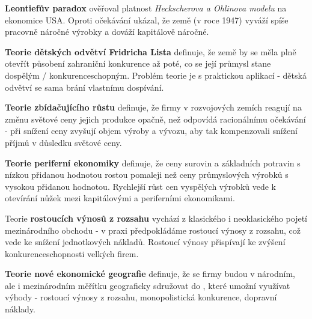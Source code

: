 \textbf{Leontiefův paradox} ověřoval platnost \textit{Heckscherova a Ohlinova modelu} na ekonomice USA. Oproti očekávání ukázal, že země (v roce 1947) vyváží spíše pracovně náročné výrobky a dováží kapitálově náročné.

\textbf{Teorie dětských odvětví Fridricha Lista} definuje, že země by se měla plně otevřít působení zahraniční konkurence až poté, co se její průmysl stane dospělým / konkurenceschopným. Problém teorie je s praktickou aplikací - dětská odvětví se sama brání vlastnímu dospívání.

\textbf{Teorie zbídačujícího růstu} definuje, že firmy v rozvojových zemích reagují na změnu světové ceny jejich produkce opačně, než odpovídá racionálnímu očekávání - při snížení ceny zvyšují objem výroby a vývozu, aby tak kompenzovali snížení příjmů v důsledku světové ceny.

\textbf{Teorie periferní ekonomiky} definuje, že ceny surovin a základních potravin s nízkou přidanou hodnotou rostou pomaleji než ceny průmyslových výrobků s vysokou přidanou hodnotou. Rychlejší růst cen vyspělých výrobků vede k otevírání nůžek mezi kapitálovými a periferními ekonomikami.

Teorie \textbf{rostoucích výnosů z rozsahu} vychází z klasického i neoklasického pojetí mezinárodního obchodu - v praxi předpokládáme rostoucí výnosy z rozsahu, což vede ke snížení jednotkových nákladů. Rostoucí výnosy přispívají ke zvýšení konkurenceschopnosti velkých firem.

\textbf{Teorie nové ekonomické geografie} definuje, že se firmy budou v národním, ale i mezinárodním měřítku geograficky sdružovat do , které umožní využívat výhody - rostoucí výnosy z rozsahu, monopolistická konkurence, dopravní náklady.